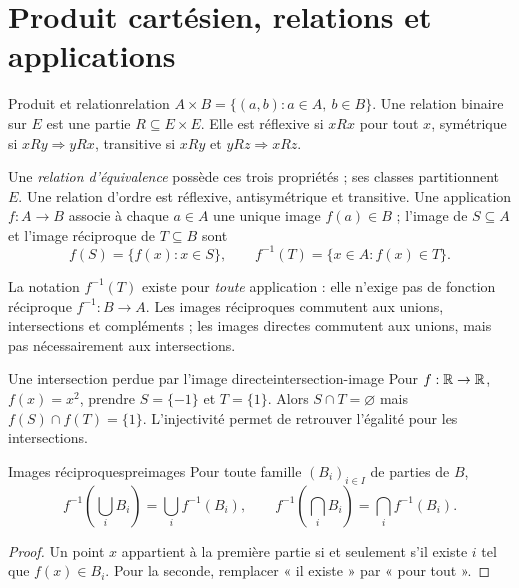 \section{Produit cartésien, relations et applications}
\begin{definition}{Produit et relation}{relation}
$A\times B=\{(a,b):a\in A,\ b\in B\}$. Une relation binaire sur $E$ est une partie $R\subseteq E\times E$. Elle est réflexive si $xRx$ pour tout $x$, symétrique si $xRy\Rightarrow yRx$, transitive si $xRy$ et $yRz\Rightarrow xRz$.
\end{definition}
Une \emph{relation d'équivalence} possède ces trois propriétés ; ses classes partitionnent $E$. Une relation d'ordre est réflexive, antisymétrique et transitive. Une application $f:A\to B$ associe à chaque $a\in A$ une unique image $f(a)\in B$ ; l'image de $S\subseteq A$ et l'image réciproque de $T\subseteq B$ sont
\[f(S)=\{f(x):x\in S\},\qquad f^{-1}(T)=\{x\in A:f(x)\in T\}.\]
\begin{attention}
La notation $f^{-1}(T)$ existe pour \emph{toute} application : elle n'exige pas de fonction réciproque $f^{-1}:B\to A$. Les images réciproques commutent aux unions, intersections et compléments ; les images directes commutent aux unions, mais pas nécessairement aux intersections.
\end{attention}
\begin{exemple}{Une intersection perdue par l'image directe}{intersection-image}
Pour $f:\mathbb R\to\mathbb R$, $f(x)=x^2$, prendre $S=\{-1\}$ et $T=\{1\}$. Alors $S\cap T=\varnothing$ mais $f(S)\cap f(T)=\{1\}$. L'injectivité permet de retrouver l'égalité pour les intersections.
\end{exemple}
\begin{proposition}{Images réciproques}{preimages}
Pour toute famille $(B_i)_{i\in I}$ de parties de $B$,
\[f^{-1}\!\left(\bigcup_i B_i\right)=\bigcup_i f^{-1}(B_i),\qquad
f^{-1}\!\left(\bigcap_i B_i\right)=\bigcap_i f^{-1}(B_i).\]
\end{proposition}
\begin{proof}Un point $x$ appartient à la première partie si et seulement s'il existe $i$ tel que $f(x)\in B_i$. Pour la seconde, remplacer « il existe » par « pour tout ».\end{proof}


